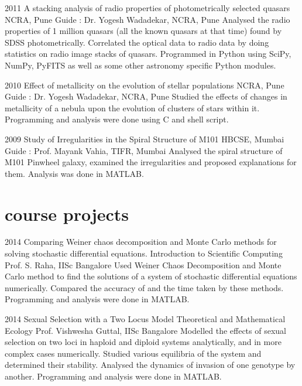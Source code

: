 \documentclass[11pt]{friggeri-cv}
\begin{document}
    \begin{entrylist}


  \entry
    {2011}
    {A stacking analysis of radio properties of photometrically selected quasars}
    {NCRA, Pune}
    {
    Guide : Dr. Yogesh Wadadekar, NCRA, Pune}
    {Analysed the radio properties of 1 million quasars (all the known quasars at that time) found by SDSS photometrically. Correlated the optical data to radio data by doing statistics on radio image stacks of quasars. Programmed in Python using SciPy, NumPy, PyFITS as well as some other astronomy specific Python modules. 
    }
    \end{entrylist}
    \begin{entrylist}
  \entry
    {2010}
    {Effect of metallicity on the evolution of stellar populations}
    {NCRA, Pune}
    {
    Guide : Dr. Yogesh Wadadekar, NCRA, Pune}
    {Studied the effects of changes in metallicity of a nebula upon the evolution of clusters of stars within it. Programming and analysis were done using C and shell script.
    }

    \end{entrylist}
\begin{entrylist}
  \entry
    {2009}
    {Study of Irregularities in the Spiral Structure of M101}
    {HBCSE, Mumbai}
    {
    Guide : Prof. Mayank Vahia, TIFR, Mumbai}
    {Analysed the spiral structure of M101 Pinwheel galaxy, examined the irregularities  and proposed explanations for them. Analysis was done in MATLAB.
    }    
\end{entrylist}

\section{course projects}

\begin{entrylist}
  \entry
    {2014}
    {Comparing Weiner chaos decomposition and Monte Carlo methods for solving stochastic differential equations.}
    {Introduction to Scientific Computing}
    {
    Prof. S. Raha, IISc Bangalore}
    {Used Weiner Chaos Decomposition and Monte Carlo method to find the solutions of a system of stochastic differential equations numerically. Compared the accuracy  of and the time taken by these methods. Programming and analysis were done in MATLAB.
    }    
\end{entrylist}
\begin{entrylist}
\entry
    {2014}
    {Sexual Selection with a Two Locus Model}
    {Theoretical and Mathematical Ecology}
    {
    Prof. Vishwesha Guttal, IISc Bangalore}
    {Modelled the effects of sexual selection on two loci in haploid and diploid systems analytically, and in more complex cases numerically. Studied various equilibria of the system and determined their stability. Analysed the dynamics of invasion of one genotype by another. Programming and analysis were done in MATLAB.
    }    
\end{entrylist}
\end{document}
